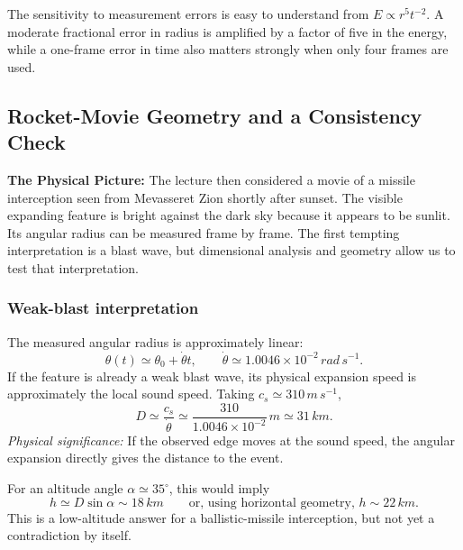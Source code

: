 The sensitivity to measurement errors is easy to understand from
$E\propto r^5t^{-2}$. A moderate fractional error in radius is amplified by a
factor of five in the energy, while a one-frame error in time also matters
strongly when only four frames are used.

\subsection{Rocket-Movie Geometry and a Consistency Check}
\label{sec:lec05:rocket-movie}

\textbf{The Physical Picture:}
The lecture then considered a movie of a missile interception seen from
Mevasseret Zion shortly after sunset. The visible expanding feature is bright
against the dark sky because it appears to be sunlit. Its angular radius can
be measured frame by frame. The first tempting interpretation is a blast wave,
but dimensional analysis and geometry allow us to test that interpretation.

\subsubsection*{Weak-blast interpretation}
The measured angular radius is approximately linear:
\begin{equation}
    \theta(t)\simeq \theta_0+\dot{\theta}t,
    \qquad
    \dot{\theta}\simeq1.0046\times10^{-2}\,\si{rad\,s^{-1}} .
    \label{eq:lec05:rocket-angular-fit}
\end{equation}
If the feature is already a weak blast wave, its physical expansion speed is
approximately the local sound speed. Taking $c_s\simeq310\,\si{m\,s^{-1}}$,
\begin{equation}
    \boxed{
    D\simeq\frac{c_s}{\dot{\theta}}
    \simeq
    \frac{310}{1.0046\times10^{-2}}\,\si{m}
    \simeq31\,\si{km}.
    }
    \label{eq:lec05:rocket-weak-distance}
\end{equation}
\textit{Physical significance:} If the observed edge moves at the sound speed,
the angular expansion directly gives the distance to the event.

For an altitude angle $\alpha\simeq35^\circ$, this would imply
\begin{equation}
    h\simeq D\sin\alpha \sim 18\,\si{km}
    \qquad
    \text{or, using horizontal geometry, } h\sim 22\,\si{km}.
    \label{eq:lec05:rocket-weak-height}
\end{equation}
This is a low-altitude answer for a ballistic-missile interception, but not
yet a contradiction by itself.

